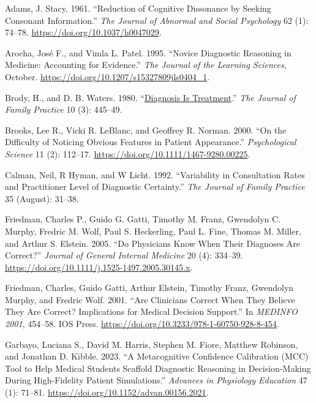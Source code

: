 \documentclass[a4paper, nobind]{templates/ociamthesis}
\newlength{\cslhangindent}
\newenvironment{CSLReferences}[2] %
 {%
  \setlength{\parindent}{0pt}
  \ifodd #1
  \let\oldpar\par
  \def\par{\hangindent=\cslhangindent\oldpar}
  \fi
  \setlength{\parskip}{1mm}
  \setlength{\baselineskip}{6mm}
 }%
 {}
\begin{document}
\label{refs}
\begin{CSLReferences}{1}{0}
Adams, J. Stacy. 1961. {``Reduction of Cognitive Dissonance by Seeking Consonant Information.''} \emph{The Journal of Abnormal and Social Psychology} 62 (1): 74--78. \url{https://doi.org/10.1037/h0047029}.

Arocha, José F., and Vimla L. Patel. 1995. {``Novice {Diagnostic} {Reasoning} in {Medicine}: {Accounting} for {Evidence}.''} \emph{The Journal of the Learning Sciences}, October. \url{https://doi.org/10.1207/s15327809jls0404_1}.

Brody, H., and D. B. Waters. 1980. {``\href{https://www.ncbi.nlm.nih.gov/pubmed/7354290}{Diagnosis Is Treatment}.''} \emph{The Journal of Family Practice} 10 (3): 445--49.

Brooks, Lee R., Vicki R. LeBlanc, and Geoffrey R. Norman. 2000. {``On the {Difficulty} of {Noticing} {Obvious} {Features} in {Patient} {Appearance}.''} \emph{Psychological Science} 11 (2): 112--17. \url{https://doi.org/10.1111/1467-9280.00225}.

Calman, Neil, R Hyman, and W Licht. 1992. {``Variability in {Consultation} {Rates} and {Practitioner} {Level} of {Diagnostic} {Certainty}.''} \emph{The Journal of Family Practice} 35 (August): 31--38.

Friedman, Charles P., Guido G. Gatti, Timothy M. Franz, Gwendolyn C. Murphy, Fredric M. Wolf, Paul S. Heckerling, Paul L. Fine, Thomas M. Miller, and Arthur S. Elstein. 2005. {``Do Physicians Know When Their Diagnoses Are Correct?''} \emph{Journal of General Internal Medicine} 20 (4): 334--39. \url{https://doi.org/10.1111/j.1525-1497.2005.30145.x}.

Friedman, Charles, Guido Gatti, Arthur Elstein, Timothy Franz, Gwendolyn Murphy, and Fredric Wolf. 2001. {``Are {Clinicians} {Correct} {When} {They} {Believe} {They} Are {Correct}? {Implications} for {Medical} {Decision} {Support}.''} In \emph{{MEDINFO} 2001}, 454--58. IOS Press. \url{https://doi.org/10.3233/978-1-60750-928-8-454}.

Garbayo, Luciana S., David M. Harris, Stephen M. Fiore, Matthew Robinson, and Jonathan D. Kibble. 2023. {``A Metacognitive Confidence Calibration ({MCC}) Tool to Help Medical Students Scaffold Diagnostic Reasoning in Decision-Making During High-Fidelity Patient Simulations.''} \emph{Advances in Physiology Education} 47 (1): 71--81. \url{https://doi.org/10.1152/advan.00156.2021}.


\end{CSLReferences}
\end{document}
